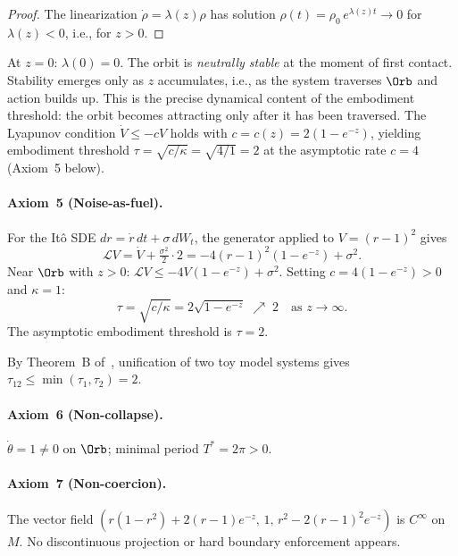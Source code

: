 \begin{proof}
The linearization $\dot\rho = \lambda(z)\rho$ has solution
$\rho(t) = \rho_0\,e^{\lambda(z)t}\to 0$ for $\lambda(z)<0$,
i.e., for $z>0$.
\end{proof}

\begin{remark}
At $z=0$: $\lambda(0) = 0$. The orbit is \emph{neutrally stable}
at the moment of first contact. Stability emerges only as $z$
accumulates, i.e., as the system traverses $\Orb$ and action
builds up. This is the precise dynamical content of the embodiment
threshold: the orbit becomes attracting only after it has been
traversed. The Lyapunov condition $\dot V\le -cV$ holds with
$c = c(z) = 2(1-e^{-z})$, yielding embodiment threshold
$\tau = \sqrt{c/\kappa} = \sqrt{4/1} = 2$ at the asymptotic
rate $c=4$ (Axiom~5 below).
\end{remark}

\paragraph{Axiom~5 (Noise-as-fuel).}
For the It\^o SDE $dr = \dot r\,dt + \sigma\,dW_t$, the generator
applied to $V=(r-1)^2$ gives
\[
  \mathcal{L}V = \dot V + \tfrac{\sigma^2}{2}\cdot 2
  = -4(r-1)^2(1-e^{-z}) + \sigma^2.
\]
Near $\Orb$ with $z>0$: $\mathcal{L}V \le -4V(1-e^{-z}) + \sigma^2$.
Setting $c=4(1-e^{-z})>0$ and $\kappa=1$:
\[
  \tau = \sqrt{c/\kappa} = 2\sqrt{1-e^{-z}}\;\nearrow\; 2
  \quad\text{as }z\to\infty.
\]
The asymptotic embodiment threshold is $\tau=2$.

\begin{corollary}
By Theorem~B of~\cite{Paper1}, unification of two toy model
systems gives $\tau_{12}\le\min(\tau_1,\tau_2)=2$.
\end{corollary}

\paragraph{Axiom~6 (Non-collapse).}
$\dot\theta=1\ne 0$ on $\Orb$; minimal period $T^*=2\pi>0$.

\paragraph{Axiom~7 (Non-coercion).}
The vector field $(r(1-r^2)+2(r-1)e^{-z},\,1,\,r^2-2(r-1)^2e^{-z})$
is $C^\infty$ on $M$. No discontinuous projection or hard boundary
enforcement appears.

